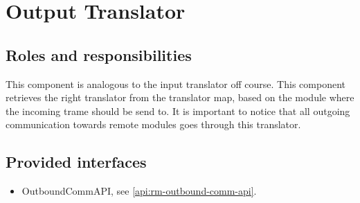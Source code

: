 \section{Output Translator}
\label{element:rm-output-translator}

\subsection{Roles and responsibilities}

\npar This component is analogous to the input translator off course. This
component retrieves the right translator from the translator map, based on the
module where the incoming trame should be send to. It is important to notice
that all outgoing communication towards remote modules goes through this
translator.

\subsection{Provided interfaces}

\begin{itemize}
  \item OutboundCommAPI, see \ref{api:rm-outbound-comm-api}.
\end{itemize}